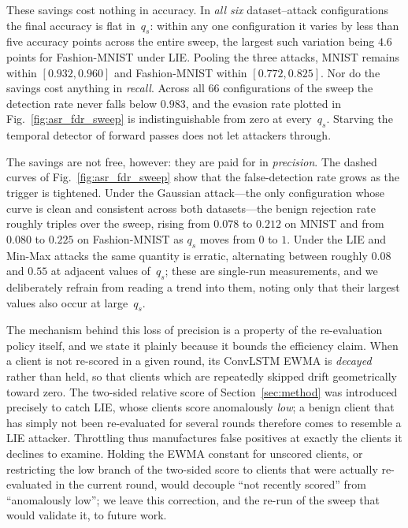 \documentclass[journal]{IEEEtran}
\begin{document}
These savings cost nothing in accuracy. In \emph{all six} dataset--attack configurations the final accuracy is flat in~$q_s$: within any one configuration it varies by less than five accuracy points across the entire sweep, the largest such variation being $4.6$ points for Fashion-MNIST under LIE. Pooling the three attacks, MNIST remains within $[0.932, 0.960]$ and Fashion-MNIST within $[0.772, 0.825]$. Nor do the savings cost anything in \emph{recall}. Across all $66$ configurations of the sweep the detection rate never falls below $0.983$, and the evasion rate plotted in Fig.~\ref{fig:asr_fdr_sweep} is indistinguishable from zero at every~$q_s$. Starving the temporal detector of forward passes does not let attackers through.

The savings are not free, however: they are paid for in \emph{precision}. The dashed curves of Fig.~\ref{fig:asr_fdr_sweep} show that the false-detection rate grows as the trigger is tightened. Under the Gaussian attack---the only configuration whose curve is clean and consistent across both datasets---the benign rejection rate roughly triples over the sweep, rising from $0.078$ to $0.212$ on MNIST and from $0.080$ to $0.225$ on Fashion-MNIST as $q_s$ moves from $0$ to $1$. Under the LIE and Min-Max attacks the same quantity is erratic, alternating between roughly $0.08$ and $0.55$ at adjacent values of~$q_s$; these are single-run measurements, and we deliberately refrain from reading a trend into them, noting only that their largest values also occur at large~$q_s$.

The mechanism behind this loss of precision is a property of the re-evaluation policy itself, and we state it plainly because it bounds the efficiency claim. When a client is not re-scored in a given round, its ConvLSTM EWMA is \emph{decayed} rather than held, so that clients which are repeatedly skipped drift geometrically toward zero. The two-sided relative score of Section~\ref{sec:method} was introduced precisely to catch LIE, whose clients score anomalously \emph{low}; a benign client that has simply not been re-evaluated for several rounds therefore comes to resemble a LIE attacker. Throttling thus manufactures false positives at exactly the clients it declines to examine. Holding the EWMA constant for unscored clients, or restricting the low branch of the two-sided score to clients that were actually re-evaluated in the current round, would decouple ``not recently scored'' from ``anomalously low''; we leave this correction, and the re-run of the sweep that would validate it, to future work.
\end{document}
